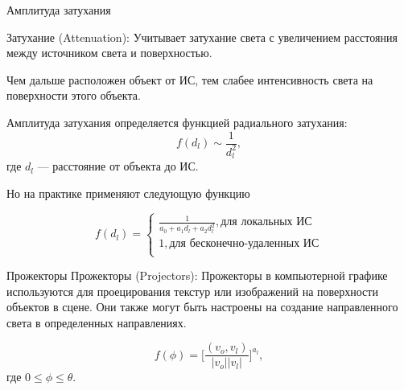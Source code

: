 \documentclass{beamer}
\begin{document}
	\begin{frame}{Амплитуда затухания}

    Затухание (Attenuation): Учитывает затухание света с увеличением расстояния между источником света и поверхностью.

		Чем дальше расположен объект от ИС, тем слабее интенсивность света на поверхности 
		этого объекта.
		
		Амплитуда затухания определяется функцией радиального затухания:
		\[
			f(d_l) \sim \frac{1}{d_l^2}
			,
		\]
		где $d_l$ --- расстояние от объекта до ИС.

		Но на практике применяют следующую функцию

		\[
			f(d_l) = 
			\begin{cases}
			\frac{1}{a_0+a_1 d_l + a_2 d_l^2}, \text{для локальных ИС} \\	
			1, \text{для бесконечно-удаленных ИС} \\	
			\end{cases}	
		\]

	\end{frame}
	
	\begin{frame}{Прожекторы}
		Прожекторы (Projectors): Прожекторы в компьютерной графике используются для проецирования текстур или изображений на поверхности объектов в сцене. Они также могут быть настроены на создание направленного света в определенных направлениях.

		\[
			f(\phi) = \bigg[ \frac{(v_o, v_l)}{|v_o||v_l|} \bigg]^{a_l}
			,
		\]
		где $0 \le \phi \le \theta$.

	\end{frame}
\end{document}
